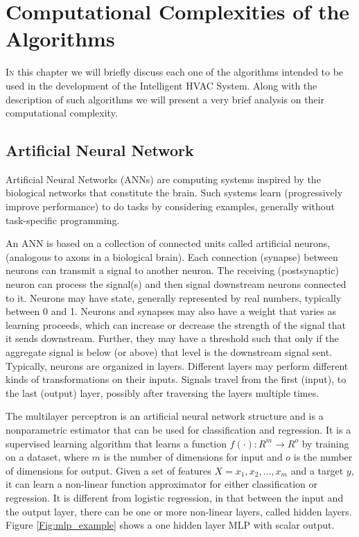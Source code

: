 \section{Computational Complexities of the Algorithms}

\lettrine[nindent=0em,lines=3]{I}n this chapter we will briefly discuss each one of the algorithms intended to be used in the development of the Intelligent HVAC System. Along with the description of such algorithms we will present a very brief analysis on their computational complexity.

\subsection{Artificial Neural Network}

Artificial Neural Networks (ANNs) are computing systems inspired by the biological networks that constitute the brain. Such systems learn (progressively improve performance) to do tasks by considering examples, generally without task-specific programming. 

An ANN is based on a collection of connected units called artificial neurons, (analogous to axons in a biological brain). Each connection (synapse) between neurons can transmit a signal to another neuron. The receiving (postsynaptic) neuron can process the signal(s) and then signal downstream neurons connected to it. Neurons may have state, generally represented by real numbers, typically between 0 and 1. Neurons and synapses may also have a weight that varies as learning proceeds, which can increase or decrease the strength of the signal that it sends downstream. Further, they may have a threshold such that only if the aggregate signal is below (or above) that level is the downstream signal sent. Typically, neurons are organized in layers. Different layers may perform different kinds of transformations on their inputs. Signals travel from the first (input), to the last (output) layer, possibly after traversing the layers multiple times. \cite{ann_wikipedia}

The multilayer perceptron is an artificial neural network structure and is a nonparametric estimator that can be used for classification and regression. It is a supervised learning algorithm that learns a function $f(\cdot): R^m \rightarrow R^o$ by training on a dataset, where $m$ is the number of dimensions for input and $o$ is the number of dimensions for output. Given a set of features $X = {x_1, x_2, ..., x_m}$ and a target $y$, it can learn a non-linear function approximator for either classification or regression. It is different from logistic regression, in that between the input and the output layer, there can be one or more non-linear layers, called hidden layers. Figure \ref{Fig:mlp_example} shows a one hidden layer MLP with scalar output. \cite{ann_scikit}

